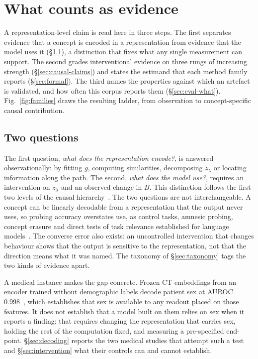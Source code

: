 \section{What counts as evidence}
\label{sec:evidence}

A representation-level claim is read here in three steps. The first separates evidence that a concept is
encoded in a representation from evidence that the model uses it (\S\ref{sec:two-questions}), a
distinction that fixes what any single measurement can support. The second grades interventional
evidence on three rungs of increasing strength (\S\ref{sec:causal-claims}) and states the estimand that
each method family reports (\S\ref{sec:formal}). The third names the properties against which an
artefact is validated, and how often this corpus reports them (\S\ref{sec:eval-what}).
Fig.~\ref{fig:families} draws the resulting ladder, from observation to concept-specific causal
contribution.

\subsection{Two questions}
\label{sec:two-questions}

The first question, \emph{what does the representation
encode?}, is answered observationally: by fitting $g$, computing similarities, decomposing $z_\lambda$ or
locating information along the path. The second, \emph{what does the model use?}, requires an
intervention on $z_\lambda$ and an observed change in $B$. This distinction follows the first two levels
of the causal hierarchy~\cite{bareinboim2022pearl}. The two questions are not interchangeable. A concept can be linearly
decodable from a representation that the output never uses, so probing accuracy overstates use, as
control tasks, amnesic probing, concept erasure and direct tests of task relevance established for
language
models~\cite{hewitt2019designing,elazar2020amnesic,ravfogel2020null,belrose2023leace,ravichander2021probing,ivanova2021probing}.
The converse error also exists: an uncontrolled intervention that changes behaviour shows that the
output is sensitive to the representation, not that the direction means what it was named. The
taxonomy of \S\ref{sec:taxonomy} tags the two kinds of evidence apart.

A medical instance makes the gap concrete. Frozen CT embeddings from an encoder trained without
demographic labels decode patient sex at AUROC 0.998~\cite{zheng2024demographic}, which establishes that
sex is available to any readout placed on those features. It does not establish that a model built on
them relies on sex when it reports a finding: that requires changing the representation that carries
sex, holding the rest of the computation fixed, and measuring a pre-specified end-point.
\S\ref{sec:decoding} reports the two medical studies that attempt such a test and
\S\ref{sec:intervention} what their controls can and cannot establish.

